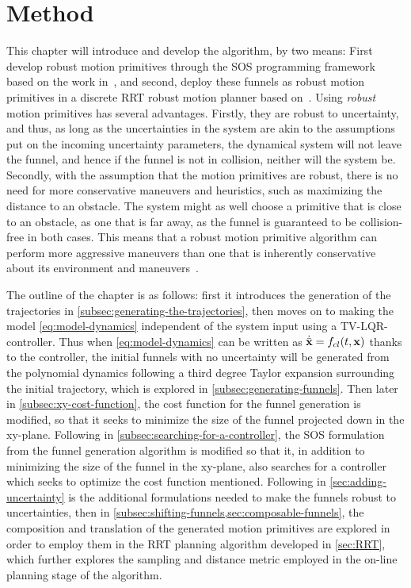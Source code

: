 \chapter{Method}
\label{chp:method}

This chapter will introduce and develop the \rrtfunnel{} algorithm, by two
means: First develop robust motion primitives through the \ac{SOS} programming
framework based on the work in~\cite{majumdarFunnelLibrariesRealtime2017}, and
second, deploy these funnels as robust motion primitives in a discrete \ac{RRT}
robust motion planner based on~\cite{Lav06}. Using \textit{robust} motion
primitives has several advantages. Firstly, they are robust to uncertainty, and
thus, as long as the uncertainties in the system are akin to the assumptions put
on the incoming uncertainty parameters, the dynamical system will not leave the
funnel, and hence if the funnel is not in collision, neither will the system be.
Secondly, with the assumption that the motion primitives are robust, there is no
need for more conservative maneuvers and heuristics, such as maximizing the
distance to an obstacle. The system might as well choose a primitive that is
close to an obstacle, as one that is far away, as the funnel is guaranteed to be
collision-free in both cases. This means that a robust motion primitive
algorithm can perform more aggressive maneuvers than one that is inherently
conservative about its environment and
maneuvers~\cite{singhRobustOnlineMotion2017}.

The outline of the chapter is as follows: first it introduces the generation of
the trajectories in \cref{subsec:generating-the-trajectories}, then moves on to
making the model \cref{eq:model-dynamics} independent of the system input using
a \ac{TV-LQR}-controller. Thus when \cref{eq:model-dynamics} can be written as
\( \dot{\bar{\mathsf{\mathbf{x}}}} = f_{cl}(t,\mathsf{\mathbf{x}}) \) thanks to the controller, the
initial funnels with no uncertainty will be generated from the polynomial
dynamics following a third degree Taylor expansion surrounding the initial
trajectory, which is explored in \cref{subsec:generating-funnels}. Then later in
\cref{subsec:xy-cost-function}, the cost function for the funnel generation is
modified, so that it seeks to minimize the size of the funnel projected down in
the xy-plane. Following in \cref{subsec:searching-for-a-controller}, the
\ac{SOS} formulation from the funnel generation algorithm is modified so that
it, in addition to minimizing the size of the funnel in the xy-plane, also
searches for a controller which seeks to optimize the cost function mentioned.
Following in \cref{sec:adding-uncertainty} is the additional formulations needed
to make the funnels robust to uncertainties, then in
\cref{subsec:shifting-funnels,sec:composable-funnels}, the composition and
translation of the generated motion primitives are explored in order to employ
them in the \ac{RRT} planning algorithm developed in \cref{sec:RRT}, which
further explores the sampling and distance metric employed in the on-line
planning stage of the algorithm.

